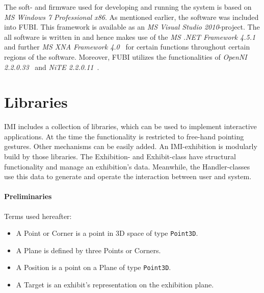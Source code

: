 The soft- and firmware used for developing and running the system is based on \textit{\ac{MS} Windows 7 Professional x86}. As mentioned earlier, the software was included into \ac{FUBI}. This framework is available as an \textit{\ac{MS} Visual Studio 2010}-project. The all software is written in  and hence makes use of the \textit{\ac{MS} .NET Framework 4.5.1}~\cite{MSNET} and further \textit{\ac{MS} XNA Framework 4.0}~\cite{MSXNA} for certain functions throughout certain regions of the software. Moreover, \ac{FUBI} utilizes the functionalities of \textit{OpenNI 2.2.0.33}~\cite{OpenNI} and \textit{NiTE 2.2.0.11}~\cite{NiTE}. 


\section{Libraries}
\label{implementation_libraries}

\ac{IMI} includes a collection of libraries, which can be used to implement interactive applications. At the time the functionality is restricted to free-hand pointing gestures. Other mechanisms can be easily added. An \ac{IMI}-exhibition is modularly build by those libraries. The Exhibition- and Exhibit-class have structural functionality and manage an exhibition's data. Meanwhile, the Handler-classes use this data to generate and operate the interaction between user and system.

\paragraph{Preliminaries} Terms used hereafter:
\begin{itemize}
	\item A Point or Corner is a point in \ac{3D} space of type \texttt{Point3D}.
	\item A Plane is defined by three Points or Corners. 
	\item A Position is a point on a Plane of type \texttt{Point3D}.
	\item A Target is an exhibit's representation on the exhibition plane.
\end{itemize}

